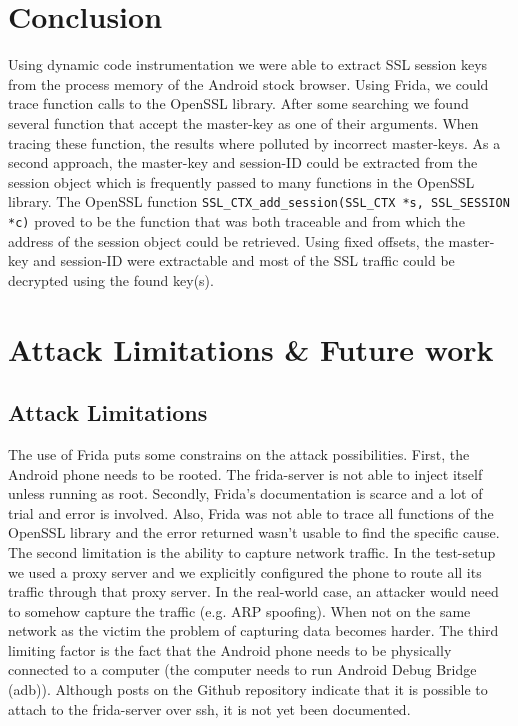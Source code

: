 \documentclass[12pt, a4paper]{report}
\begin{document}
\chapter{Conclusion}


Using dynamic code instrumentation we were able to extract SSL session keys from the process memory of the Android stock browser. Using Frida, we could trace function calls to the OpenSSL library. After some searching we found several function that accept the master-key as one of their arguments. When tracing these function, the results where polluted by incorrect master-keys. As a second approach, the master-key and session-ID could be extracted from the session object which is frequently passed to many functions in the OpenSSL library. 
\newline
\newline
The OpenSSL function \texttt{SSL\_CTX\_add\_session(SSL\_CTX *s, SSL\_SESSION *c)} proved to be the function that was both traceable and from which the address of the session object could be retrieved. Using fixed offsets, the master-key and session-ID were extractable and most of the SSL traffic could be decrypted using the found key(s).


\chapter{Attack Limitations \& Future work}


\section{Attack Limitations}
The use of Frida puts some constrains on the attack possibilities. First, the Android phone needs to be rooted. The frida-server is not able to inject itself unless running as root. Secondly, Frida's documentation is scarce and a lot of trial and error is involved. Also, Frida was not able to trace all functions of the OpenSSL library and the error returned wasn’t usable to find the specific cause.  
\newline
\newline
The second limitation is the ability to capture network traffic. In the test-setup we used a proxy server and we explicitly configured the phone to route all its traffic through that proxy server. In the real-world case, an attacker would need to somehow capture the traffic (e.g. ARP spoofing). When not on the same network as the victim the problem of capturing data becomes harder. 
\newline
\newline
The third limiting factor is the fact that the Android phone needs to be physically connected to a computer (the computer needs to run Android Debug Bridge (adb)). Although posts on the Github repository indicate that it is possible to attach to the frida-server over ssh, it is not yet been documented.   
\end{document}
